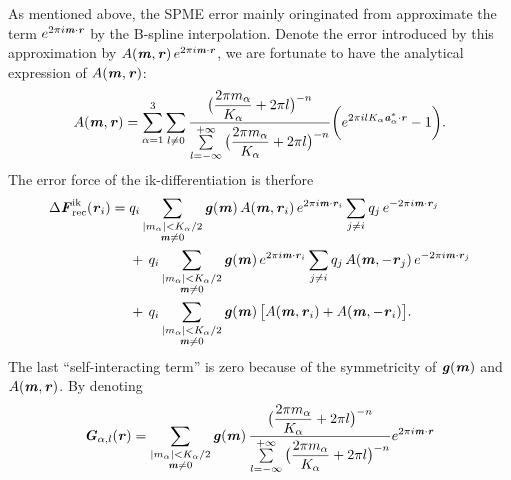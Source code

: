\documentclass[aps,pre,preprint]{revtex4}
\renewcommand{\v}[1]{\textbf{\textit{#1}}}
\begin{document}
As mentioned above, the SPME error mainly oringinated from approximate
the term $e^{2\pi i\v m\cdot\v r}$ by the B-spline
interpolation. Denote the error introduced by this approximation by
$A(\v m, \v r)\,e^{2\pi i\v m\cdot \v r}$, we are fortunate to have
the analytical expression of $A(\v m, \v r)$:
\begin{align}
  A(\v m, \v r)
  =
  \sum_{\alpha=1}^3\sum_{l\neq 0}
  \frac
  {\big(\dfrac{2\pi m_\alpha}{K_\alpha} + 2\pi l\big)^{-n}}
  {\sum\limits_{l=-\infty}^{+\infty}
    \big(\dfrac{2\pi m_\alpha}{K_\alpha} + 2\pi l\big)^{-n}}
  \bigg(
  e^{2\pi i l K_\alpha\v a^\ast_\alpha\cdot \v r} - 1
  \bigg).
\end{align}
The error force of the ik-differentiation is therfore
\begin{align}\nonumber
  \Delta\v F_{\textrm{rec}}^{\textrm{ik}}(\v r_i)
  =\;&
  q_i
  \sum_{
    \begin{subarray}{c}
      \vert m_{\alpha}\vert < K_\alpha/2\\
      \v m\neq 0
    \end{subarray}}
  \v g(\v m)\,
  A(\v m, \v r_i)\,
  e^{2\pi i\v m\cdot \v r_i}
  \sum_{j\neq i}q_j\,e^{-2\pi i\v m\cdot\v r_j} \\\nonumber
  & +\,
  q_i
  \sum_{
    \begin{subarray}{c}
      \vert m_{\alpha}\vert < K_\alpha/2\\
      \v m\neq 0
    \end{subarray}}
  \v g(\v m)\,
  e^{2\pi i\v m\cdot \v r_i}
  \sum_{j\neq i}q_j\,A(\v m, -\v r_j)\,e^{-2\pi i\v m\cdot\v r_j}\\\nonumber
  & +\,
  q_i
  \sum_{
    \begin{subarray}{c}
      \vert m_{\alpha}\vert < K_\alpha/2\\
      \v m\neq 0
    \end{subarray}}
  \v g(\v m)\,
  \big[
  A(\v m, \v r_i) +
  A(\v m, -\v r_i)
  \big].
\end{align}
The last ``self-interacting term'' is zero because of the symmetricity
of $\v g(\v m)$ and $A(\v m, \v r)$. 
By denoting
\begin{align}
  \v G_{\alpha,l}(\v r) =
  \sum_{
    \begin{subarray}{c}
      \vert m_{\alpha}\vert < K_\alpha/2\\
      \v m\neq 0
    \end{subarray}}
  \v g(\v m)\,
  \frac
  {\big(\dfrac{2\pi m_\alpha}{K_\alpha} + 2\pi l\big)^{-n}}
  {\sum\limits_{l=-\infty}^{+\infty}
    \big(\dfrac{2\pi m_\alpha}{K_\alpha} + 2\pi l\big)^{-n}}
  e^{2\pi i\v m\cdot\v r}
\end{align}
\end{document}
